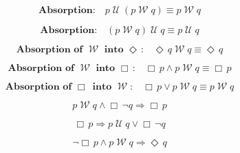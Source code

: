 \documentclass[12pt, fleqn, leqno]{article}
\newcommand{\impl}{\ensuremath{\Rightarrow}}        %
\newcommand{\Until}{\;\mathcal{U}\;}
\newcommand{\Wait}{\;\mathcal{W}\;}
\newcommand{\Event}{\Diamond\,}
\newcommand{\Always}{\Box\,}
\newcommand{\spacer}{\vspace{-30pt}}
\begin{document}
\spacer

\begin{equation}\label{E:leftUntilAbsWait}
\textbf{Absorption:}\quad p \Until (p \Wait q) \equiv p \Wait q
\end{equation}

\spacer

\begin{equation}\label{E:rightUntilAbsWait}
\textbf{Absorption:}\quad (p \Wait q) \Until q \equiv p \Until q
\end{equation}

\spacer

\begin{equation}\label{E:absorpEventWait}
\textbf{Absorption of $\Wait$ into $\Event$:}\quad \Event q \Wait q \equiv \Event q
\end{equation}

\spacer

\begin{equation}\label{E:absWaitAlways}
\textbf{Absorption of $\Wait$ into $\Always$:}\quad \Always p\land p\Wait q\equiv \Always p
\end{equation}

\spacer

\begin{equation}\label{E:absAlwaysWait}
\textbf{Absorption of $\Always$ into $\Wait$:}\quad \Always p\lor p\Wait q\equiv p\Wait q
\end{equation}

\spacer

\begin{equation}\label{E:waitEntailAlways}
p \Wait q \land \Always\neg q \impl \Always p
\end{equation}

\spacer

\begin{equation}\label{E:untilEntailAlways}
\Always p\impl p \Until q \lor \Always\neg q 
\end{equation}

\spacer

\begin{equation}\label{E:waitEntailEvent}
\neg\Always p\land p \Wait q \impl \Event q
\end{equation}
\end{document}
